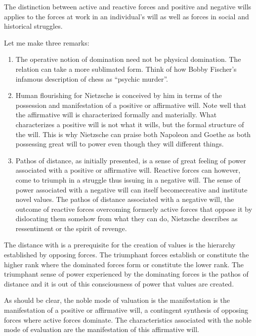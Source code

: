 The distinction between active and reactive forces and positive and negative wills applies to the forces at work in an individual's will as well as forces in social and historical struggles. 

Let me make three remarks:

\begin{enumerate}
	\item The operative notion of domination need not be physical domination. The relation can take a more sublimated form. Think of how Bobby Fischer's infamous description of chess as ``psychic murder''.
	\item Human flourishing for Nietzsche is conceived by him in terms of the possession and manifestation of a positive or affirmative will. Note well that the affirmative will is characterized formally and materially. What characterizes a positive will is not what it wills, but the formal structure of the will. This is why Nietzsche can praise both Napoleon and Goethe as both possessing great will to power even though they will different things.
	\item Pathos of distance, as initially presented, is a sense of great feeling of power associated with a positive or affirmative will. Reactive forces can however, come to triumph in a struggle thus issuing in a negative will. The sense of power associated with a negative will can itself becomecreative and institute novel values. The pathos of distance associated with a negative will, the outcome of reactive forces overcoming formerly active forces that oppose it by dislocating them somehow from what they can do, Nietzsche describes as ressentiment or the spirit of revenge.
\end{enumerate}

The distance with is a prerequisite for the creation of values is the hierarchy established by opposing forces. The triumphant forces establish or constitute the higher rank where the dominated forces form or constitute the lower rank. The triumphant sense of power experienced by the dominating forces is the pathos of distance and it is out of this consciousness of power that values are created.

As should be clear, the noble mode of valuation is the manifestation is the manifestation of a positive or affirmative will, a contingent synthesis of opposing forces where active forces dominate. The characteristics associated with the noble mode of evaluation are the manifestation of this affirmative will.

